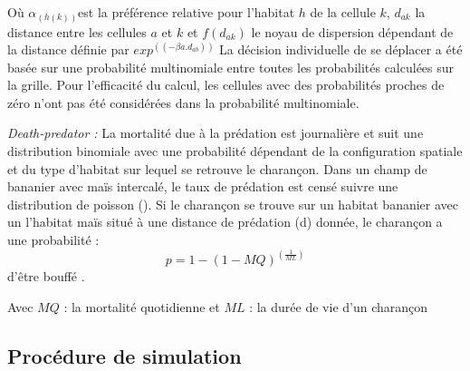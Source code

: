{Où $\alpha_{(h(k))}$est la préférence relative pour l'habitat $h$ de la cellule $k$, $d_{ak}$ la distance entre les cellules $a$ et $k$ et $f(d_{ak})$ le noyau de dispersion dépendant de la distance définie par $exp^{((-\beta a.d_{ab}))}$ La décision individuelle de se déplacer a été basée sur une probabilité multinomiale entre toutes les probabilités calculées sur la grille. Pour l'efficacité du calcul, les cellules avec des probabilités proches de zéro n'ont pas été considérées dans la probabilité multinomiale.

\textit{Death-predator :} La mortalité due à la prédation est journalière et suit une distribution binomiale avec une probabilité dépendant de la configuration spatiale et du type d’habitat sur lequel se retrouve le charançon. Dans un champ de bananier avec maïs intercalé, le taux de prédation est censé suivre une distribution de poisson (\cite{hilker2006parameterizing}). Si le charançon se trouve sur un habitat bananier avec un l’habitat maïs situé à une distance de prédation (d) donnée, le charançon a une probabilité : $$p=1-(1-MQ)^{(\frac{1}{ML})} $$ d'être bouffé \cite{bousquet2001multiagent}.

Avec $MQ$ : la mortalité quotidienne et $ML$ : la durée de vie d’un charançon }
\subsection{Procédure de simulation}
